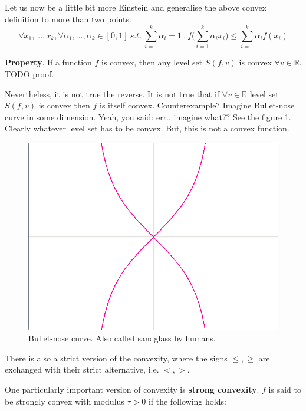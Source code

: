 \par Let us now be a little bit more Einstein and generalise the above convex definition to more than two points.
\begin{equation}
    \forall x_1,...,x_k, \forall \alpha_1,...,\alpha_k \in [0,1]\ s.t.\ \sum_{i=1}^k \alpha_i = 1\ .\ f\Big(\sum_{i=1}^k \alpha_i x_i\Big) \leq \sum_{i=1}^k \alpha_i f(x_i)
\end{equation}
\par \textbf{Property}. If a function $f$ is convex, then any level set $S(f,v)$ is convex $\forall v \in \mathbb{R}$. TODO proof.
\par Nevertheless, it is not true the reverse. It is not true that if $\forall v \in \mathbb{R}$ level set $S(f,v)$ is convex then $f$ is itself convex. Counterexample? Imagine Bullet-nose curve in some dimension. Yeah, you said: err.. imagine what?? See the figure \ref{fig:chapter2-sandglass}. Clearly whatever level set has to be convex. But, this is not a convex function.
\begin{figure}
    \centering
    \includegraphics[scale=0.3]{figures/2/chapter2-sandglass.png}
    \caption{Bullet-nose curve. Also called sandglass by humans.}
    \label{fig:chapter2-sandglass}
\end{figure}
\par There is also a strict version of the convexity, where the signs $\leq,\geq$ are exchanged with their strict alternative, i.e. $<,>$.
\par One particularly important version of convexity is \textbf{strong convexity}. $f$ is said to be strongly convex with modulus $\tau > 0$ if the following holds:
